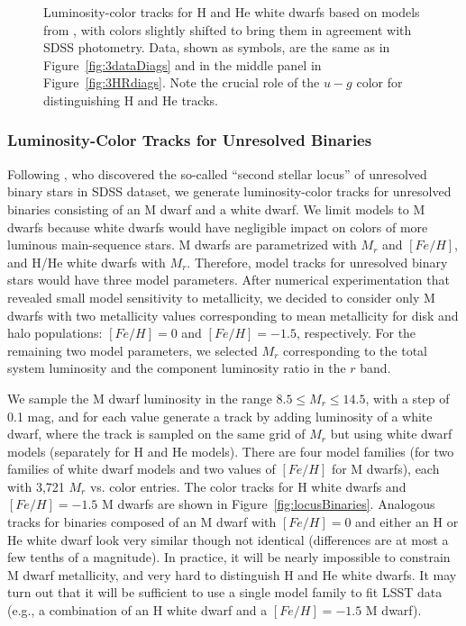 \begin{figure}[ht!]
\caption{Luminosity-color tracks for H and He white dwarfs based on models from \cite{1995PASP..107.1047B}, with
  colors slightly shifted to bring them in agreement with SDSS photometry. Data, shown as symbols, are the same as in
  Figure~\ref{fig:3dataDiags} and in the middle panel in Figure~\ref{fig:3HRdiags}. Note the crucial role of the $u-g$ color
  for distinguishing H and He tracks.}
\label{fig:locusWDs}
\end{figure}


\subsubsection{Luminosity-Color Tracks for Unresolved Binaries}

Following \cite{2004ApJ...615L.141S}, who discovered the so-called ``second stellar locus'' of unresolved binary
stars in SDSS dataset, we generate luminosity-color tracks for unresolved binaries consisting of an M dwarf and a white dwarf.
We limit models to M dwarfs because white dwarfs would have negligible impact on colors of more luminous main-sequence stars. 
M dwarfs are parametrized with $M_r$ and $[Fe/H]$, and H/He white dwarfs with $M_r$. Therefore, model tracks for unresolved binary
stars would have three model parameters. After numerical experimentation that revealed small model sensitivity to metallicity, we
decided to consider only M dwarfs with two metallicity values corresponding to mean metallicity for disk and halo populations:
$[Fe/H]=0$ and $[Fe/H]=-1.5$, respectively. For the remaining two model parameters, we selected $M_r$ corresponding to the
total system luminosity and the component luminosity ratio in the $r$ band. 

We sample the M dwarf luminosity in the range $8.5 \le M_r \le 14.5$, with a step of 0.1 mag, and for each value
generate a track by adding luminosity of a white dwarf, where the track is sampled on the same grid of $M_r$ but
using white dwarf models (separately for H and He models). There are four model families (for two families of white dwarf
models and two values of $[Fe/H]$ for M dwarfs), each with 3,721 $M_r$ vs. color entries. The color tracks for H white dwarfs
and $[Fe/H]=-1.5$ M dwarfs are shown in Figure~\ref{fig:locusBinaries}. Analogous tracks for binaries composed of an M dwarf with
$[Fe/H]=0$ and either an H or He white dwarf look very similar though not identical (differences are at most a few tenths
of a magnitude). In practice, it will be nearly impossible to constrain M dwarf metallicity, and very hard to distinguish
H and He white dwarfs. It may turn out that it will be sufficient to use a single model family to fit LSST data (e.g., a
combination of an H white dwarf and a $[Fe/H]=-1.5$ M dwarf). 



